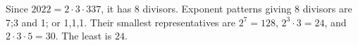 Since $ 2022=2\cdot3\cdot337 $, it has 8 divisors. Exponent patterns giving 8 divisors are 7;3 and 1; or 1,1,1. Their smallest representatives are $ 2^7=128 $, $ 2^3\cdot3=24 $, and $ 2\cdot3\cdot5=30 $. The least is $\boxed{24}$.
